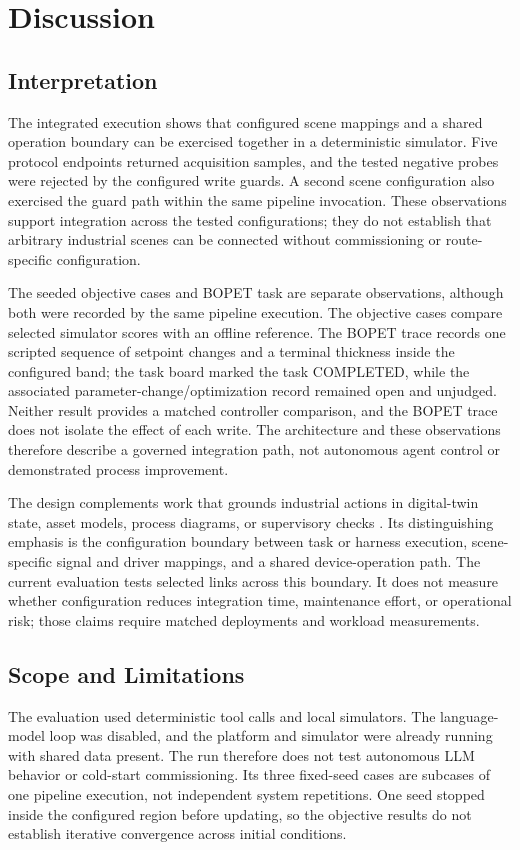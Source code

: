 \section{Discussion}
\label{sec:discussion}
\subsection{Interpretation}
The integrated execution shows that configured scene mappings and a shared
operation boundary can be exercised together in a deterministic simulator.
Five protocol endpoints returned acquisition samples, and the tested negative
probes were rejected by the configured write guards. A second scene configuration
also exercised the guard path within the same pipeline invocation. These
observations support integration across the tested configurations; they do
not establish that arbitrary industrial scenes can be connected without
commissioning or route-specific configuration.

The seeded objective cases and BOPET task are separate observations, although
both were recorded by the same pipeline execution. The objective cases
compare selected simulator scores with an offline reference. The BOPET trace
records one scripted sequence of setpoint changes and a terminal thickness
inside the configured band; the task board marked the task COMPLETED, while
the associated parameter-change/optimization record remained open and unjudged.
Neither result provides a matched controller comparison, and the BOPET trace
does not isolate the effect of each write. The architecture and these
observations therefore describe a governed integration path, not autonomous
agent control or demonstrated process improvement.

The design complements work that grounds industrial actions in digital-twin
state, asset models, process diagrams, or supervisory checks
\cite{gehrmann2020dtiacs,graul2026aas,schall2026safe}. Its distinguishing
emphasis is the configuration boundary between task or harness execution,
scene-specific signal and driver mappings, and a shared device-operation path.
The current evaluation tests selected links across this boundary. It does not
measure whether configuration reduces integration time, maintenance effort,
or operational risk; those claims require matched deployments and workload
measurements.

\subsection{Scope and Limitations}
The evaluation used deterministic tool calls and local simulators. The
language-model loop was disabled, and the platform and simulator were already
running with shared data present. The run therefore does not test autonomous
LLM behavior or cold-start commissioning. Its three fixed-seed cases are
subcases of one pipeline execution, not independent system repetitions. One
seed stopped inside the configured region before updating, so the objective
results do not establish iterative convergence across initial conditions.

